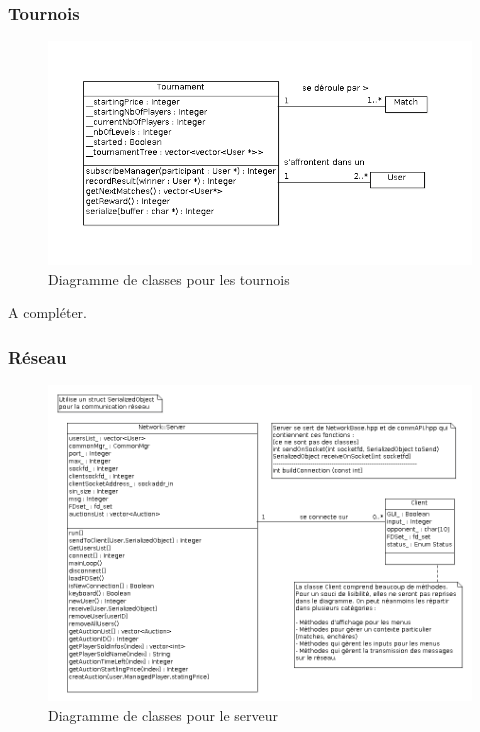 \documentclass[a4paper,titlepage]{scrreprt}
\begin{document}
      \subsubsection{Tournois}
          \begin{figure}[H]
          \center
          \includegraphics[scale=0.4]{uml/class/Tournament.png}
         \caption{Diagramme de classes pour les tournois}
         \end{figure}

         A compléter.
        
      \subsubsection{Réseau}
          \begin{figure}[H]
          \center
          \includegraphics[scale=0.4]{uml/class/Server.png}
         \caption{Diagramme de classes pour le serveur}
         \end{figure}
\end{document}

